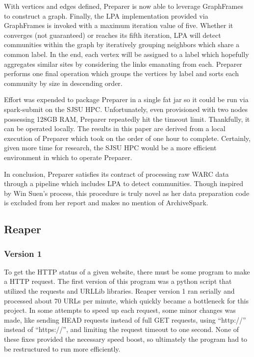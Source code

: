 \documentclass[conference]{IEEEtran}
\begin{document}
With vertices and edges defined, Preparer is now able to leverage GraphFrames to construct a graph. Finally, the LPA implementation provided via GraphFrames is invoked with a maximum iteration value of five. Whether it converges (not guaranteed) or reaches its fifth iteration, LPA will detect communities within the graph by iteratively grouping neighbors which share a common label. In the end, each vertex will be assigned to a label which hopefully aggregates similar sites by considering the links emanating from each. Preparer performs one final operation which groups the vertices by label and sorts each community by size in descending order.

Effort was expended to package Preparer in a single fat jar so it could be run via spark-submit on the SJSU HPC. Unfortunately, even provisioned with two nodes possessing 128GB RAM, Preparer repeatedly hit the timeout limit. Thankfully, it can be operated locally. The results in this paper are derived from a local execution of Preparer which took on the order of one hour to complete. Certainly, given more time for research, the SJSU HPC would be a more efficient environment in which to operate Preparer.

In conclusion, Preparer satisfies its contract of processing raw WARC data through a pipeline which includes LPA to detect communities. Though inspired by Win Suen's process, this procedure is truly novel as her data preparation code is excluded from her report and makes no mention of ArchiveSpark.

\subsection{Reaper}

\subsubsection{Version 1}

To get the HTTP status of a given website, there must be some program to make a HTTP request. The first version of this program was a python script that utilized the requests and URLLib libraries. Reaper version 1 ran serially and processed about 70 URLs per minute, which quickly became a bottleneck for this project. In some attempts to speed up each request, some minor changes was made, like sending HEAD requests instead of full GET requests, using ``http://'' instead of ``https://'', and limiting the request timeout to one second. None of these fixes provided the necessary speed boost, so ultimately the program had to be restructured to run more efficiently.
\end{document}
